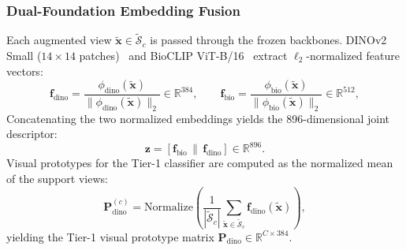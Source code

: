 \documentclass[preprint,12pt]{elsarticle}
\begin{document}
\subsubsection{Dual-Foundation Embedding Fusion}
Each augmented view $\tilde{\mathbf{x}} \in \tilde{\mathcal{S}}_c$ is passed through the frozen backbones. DINOv2 Small ($14\times 14$ patches)~\cite{oquab2023dinov2} and BioCLIP ViT-B/16~\cite{stevens2024bioclip} extract $\ell_2$-normalized feature vectors:
\begin{equation}
    \mathbf{f}_{\text{dino}} = \frac{\phi_{\text{dino}}(\tilde{\mathbf{x}})}{\|\phi_{\text{dino}}(\tilde{\mathbf{x}})\|_2} \in \mathbb{R}^{384}, \qquad
    \mathbf{f}_{\text{bio}} = \frac{\phi_{\text{bio}}(\tilde{\mathbf{x}})}{\|\phi_{\text{bio}}(\tilde{\mathbf{x}})\|_2} \in \mathbb{R}^{512},
\end{equation}
Concatenating the two normalized embeddings yields the 896-dimensional joint descriptor:
\begin{equation}
    \mathbf{z} = [\mathbf{f}_{\text{bio}} \,\|\, \mathbf{f}_{\text{dino}}] \in \mathbb{R}^{896}.
\end{equation}
Visual prototypes for the Tier-1 classifier are computed as the normalized mean of the support views:
\begin{equation}
    \mathbf{P}_{\text{dino}}^{(c)} = \text{Normalize}\left(\frac{1}{|\tilde{\mathcal{S}}_c|}\sum_{\tilde{\mathbf{x}} \in \tilde{\mathcal{S}}_c} \mathbf{f}_{\text{dino}}(\tilde{\mathbf{x}})\right),
\end{equation}
yielding the Tier-1 visual prototype matrix $\mathbf{P}_{\text{dino}} \in \mathbb{R}^{C \times 384}$.
\end{document}
